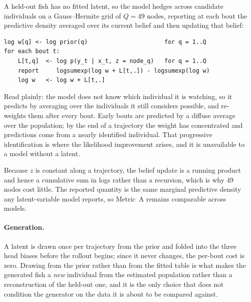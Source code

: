 A held-out fish has no fitted latent, so the model hedges across candidate
individuals on a Gauss--Hermite grid of $Q=49$ nodes, reporting at each bout
the predictive density averaged over its current belief and then updating that
belief:

\begin{center}
\begin{minipage}{0.86\textwidth}
\begin{verbatim}
log w[q] <- log prior(q)                      for q = 1..Q
for each bout t:
    L[t,q]  <- log p(y_t | x_t, z = node_q)   for q = 1..Q
    report     logsumexp(log w + L[t,.]) - logsumexp(log w)
    log w   <- log w + L[t,.]
\end{verbatim}
\end{minipage}
\end{center}

\noindent Read plainly: the model does not know which individual it is
watching, so it predicts by averaging over the individuals it still considers
possible, and re-weights them after every bout. Early bouts are predicted by a
diffuse average over the population; by the end of a trajectory the weight has
concentrated and predictions come from a nearly identified individual. That
progressive identification is where the likelihood improvement arises, and it
is unavailable to a model without a latent.

Because $z$ is constant along a trajectory, the belief update is a running
product and hence a cumulative sum in logs rather than a recursion, which is
why $49$ nodes cost little. The reported quantity is the same marginal
predictive density any latent-variable model reports, so Metric~A remains
comparable across models.

\paragraph{Generation.} A latent is drawn once per trajectory from the prior
and folded into the three head biases before the rollout begins; since it never
changes, the per-bout cost is zero. Drawing from the prior rather than from the
fitted table is what makes the generated fish a \emph{new} individual from the
estimated population rather than a reconstruction of the held-out one, and it
is the only choice that does not condition the generator on the data it is
about to be compared against.

